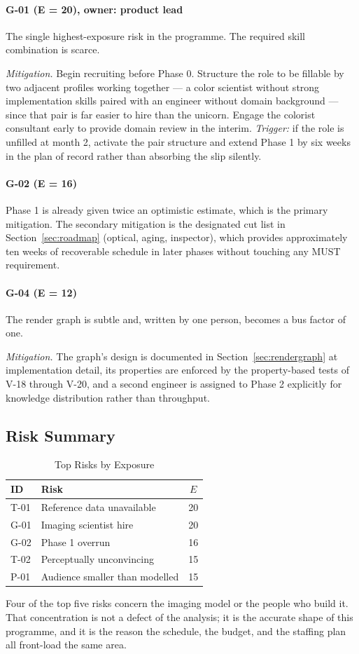\paragraph{G-01 (E = 20), owner: product lead}
The single highest-exposure risk in the programme. The required skill
combination is scarce.

\emph{Mitigation.} Begin recruiting before Phase 0. Structure the role to be
fillable by two adjacent profiles working together --- a color scientist without
strong implementation skills paired with an engineer without domain background
--- since that pair is far easier to hire than the unicorn. Engage the colorist
consultant early to provide domain review in the interim. \emph{Trigger:} if the
role is unfilled at month 2, activate the pair structure and extend Phase 1 by
six weeks in the plan of record rather than absorbing the slip silently.

\paragraph{G-02 (E = 16)}
Phase 1 is already given twice an optimistic estimate, which is the primary
mitigation. The secondary mitigation is the designated cut list in
Section~\ref{sec:roadmap} (optical, aging, inspector), which provides
approximately ten weeks of recoverable schedule in later phases without touching
any MUST requirement.

\paragraph{G-04 (E = 12)}
The render graph is subtle and, written by one person, becomes a bus factor of
one.

\emph{Mitigation.} The graph's design is documented in
Section~\ref{sec:rendergraph} at implementation detail, its properties are
enforced by the property-based tests of V-18 through V-20, and a second engineer
is assigned to Phase 2 explicitly for knowledge distribution rather than
throughput.

\subsection{Risk Summary}

\begin{table}[htbp]
\caption{Top Risks by Exposure}
\label{tab:toprisk}
\begin{center}
\renewcommand{\arraystretch}{1.15}
\begin{tabular}{@{}llc@{}}
\toprule
\textbf{ID} & \textbf{Risk} & $E$ \\
\midrule
T-01 & Reference data unavailable & 20 \\
G-01 & Imaging scientist hire & 20 \\
G-02 & Phase 1 overrun & 16 \\
T-02 & Perceptually unconvincing & 15 \\
P-01 & Audience smaller than modelled & 15 \\
\bottomrule
\end{tabular}
\end{center}
\end{table}

Four of the top five risks concern the imaging model or the people who build it.
That concentration is not a defect of the analysis; it is the accurate shape of
this programme, and it is the reason the schedule, the budget, and the staffing
plan all front-load the same area.
